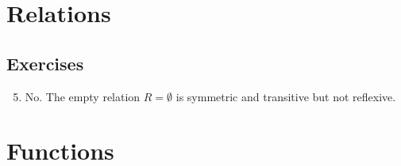 \section{Relations}
\subsection*{Exercises}
\begin{enumerate}[\thesection-1]
%
\setcounter{enumi}{4}
%
\item No. The empty relation $R = \emptyset$ is symmetric and transitive but not reflexive.
%
\end{enumerate}

\section{Functions}
